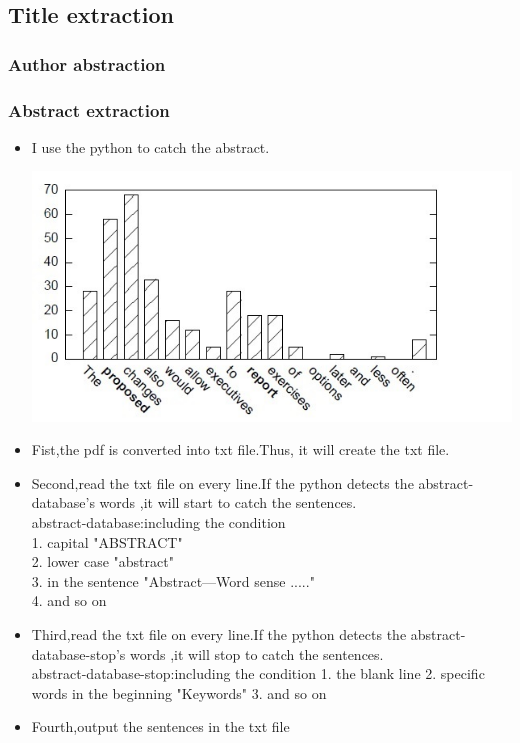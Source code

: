 	
\subsection*{Title extraction}

\subsubsection*{Author abstraction}


\subsubsection*{Abstract extraction}
\begin{itemize}
	\item I use the python to catch the abstract.
	\begin{center}
		\includegraphics[width=0.8\columnwidth]{Union_Background_Chart_2}
	\end{center}
	\item Fist,the pdf is converted into txt file.Thus, it will create the txt file.\\ 
	\item Second,read the txt file on every line.If the python detects the abstract-database's words ,it will start to catch the sentences.\\ 	
	abstract-database:including the condition\\
	1. capital         "ABSTRACT"\\
	2. lower case      "abstract"\\
	3. in the sentence "Abstract—Word sense ....."\\
	4. and so on \\
	\item Third,read the txt file on every line.If the python detects the abstract-database-stop's words ,it will stop to catch the sentences.\\ 
	abstract-database-stop:including the condition
	1. the blank line
	2. specific words in the beginning "Keywords"
	3. and so on
	\item Fourth,output the sentences in the txt file\\ 	
	
\end{itemize}
\newpage %